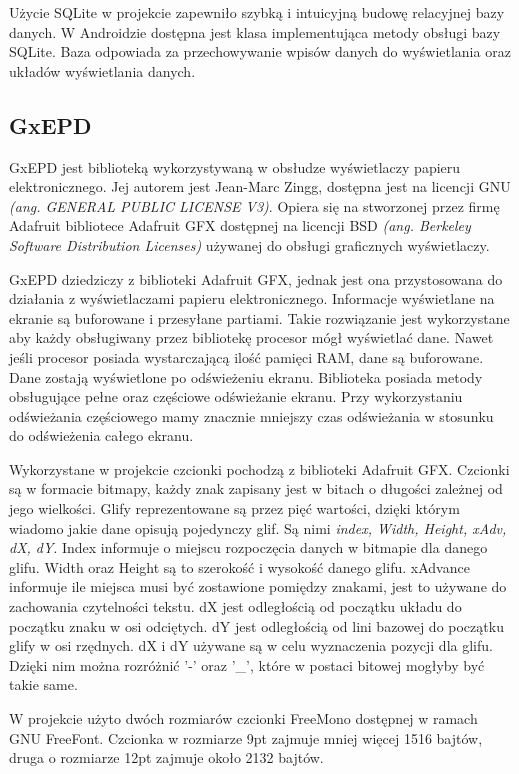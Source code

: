 \documentclass[a4paper,12pt, twoside]{article}
\begin{document}
    	Użycie SQLite w projekcie zapewniło szybką i intuicyjną budowę relacyjnej bazy danych. W Androidzie dostępna jest klasa implementująca metody obsługi bazy SQLite. Baza odpowiada za przechowywanie wpisów danych do wyświetlania oraz układów wyświetlania danych. 
    	
    	\subsection{GxEPD}\label{GxEPD}
    	GxEPD jest biblioteką wykorzystywaną w obsłudze wyświetlaczy papieru elektronicznego. Jej autorem jest Jean-Marc Zingg, dostępna jest na licencji GNU \textit{(ang. GENERAL PUBLIC LICENSE V3)}. Opiera się na stworzonej przez firmę Adafruit bibliotece Adafruit GFX dostępnej na licencji BSD \textit{(ang. Berkeley Software Distribution Licenses)} używanej do obsługi graficznych wyświetlaczy.
    	
    	GxEPD dziedziczy z biblioteki Adafruit GFX, jednak jest ona przystosowana do działania z wyświetlaczami papieru elektronicznego. Informacje wyświetlane na ekranie są buforowane i przesyłane partiami. Takie rozwiązanie jest wykorzystane aby każdy obsługiwany przez bibliotekę procesor mógł wyświetlać dane. Nawet jeśli procesor posiada wystarczającą ilość pamięci RAM, dane są buforowane. Dane zostają wyświetlone po odświeżeniu ekranu. Biblioteka posiada metody obsługujące pełne oraz częściowe odświeżanie ekranu. Przy wykorzystaniu odświeżania częściowego mamy znacznie mniejszy czas odświeżania w stosunku do odświeżenia całego ekranu.
    	
        Wykorzystane w projekcie czcionki pochodzą z biblioteki Adafruit GFX. Czcionki są w formacie bitmapy, każdy znak zapisany jest w bitach o długości zależnej od jego wielkości. Glify reprezentowane są przez pięć wartości, dzięki którym wiadomo jakie dane opisują pojedynczy glif. Są nimi \textit{index,  Width, Height, xAdv, dX, dY}. Index informuje o miejscu rozpoczęcia danych w bitmapie dla danego glifu. Width oraz Height są to szerokość i wysokość danego glifu. xAdvance informuje ile miejsca musi być zostawione pomiędzy znakami, jest to używane do zachowania czytelności tekstu. dX jest odległością od początku układu do początku znaku w osi odciętych. dY jest odległością od lini bazowej do początku glify w osi rzędnych. dX i dY używane są w celu wyznaczenia pozycji dla glifu. Dzięki nim można rozróżnić '-' oraz '\_', które w postaci bitowej mogłyby być takie same.
        
        W projekcie użyto dwóch rozmiarów czcionki FreeMono dostępnej w ramach GNU FreeFont. Czcionka w rozmiarze 9pt zajmuje mniej więcej 1516 bajtów, druga o rozmiarze 12pt zajmuje około 2132 bajtów.
        
\end{document}
